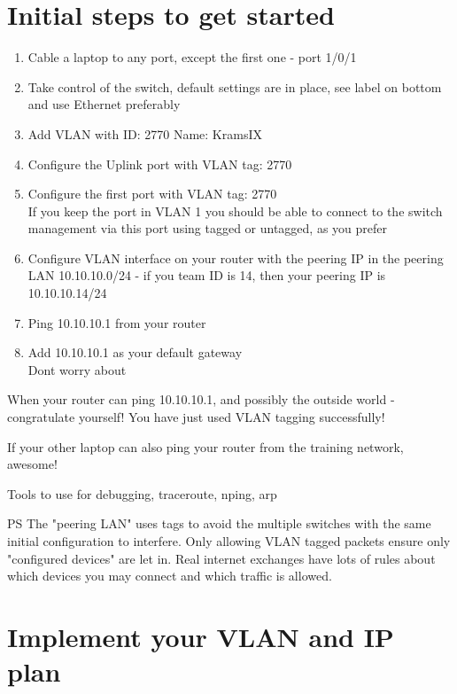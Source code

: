 \documentclass[a4paper,11pt,notitlepage]{report}
\begin{document}
\section*{Initial steps to get started}
\begin{enumerate}
\item Cable a laptop to any port, except the first one - port 1/0/1
\item Take control of the switch, default settings are in place, see label on bottom and use Ethernet preferably
\item Add VLAN with ID: 2770 Name: KramsIX
\item Configure the Uplink port with VLAN tag: 2770
\item Configure the first port with VLAN tag: 2770\\
If you keep the port in VLAN 1 you should be able to connect to the switch management via this port using tagged or untagged, as you prefer \smiley
\item Configure VLAN interface on your router with the peering IP in the peering LAN 10.10.10.0/24 - if you team ID is 14, then your peering IP is 10.10.10.14/24
\item Ping 10.10.10.1 from your router
\item Add 10.10.10.1 as your default gateway\\
Dont worry about
\end{enumerate}


When your router can ping 10.10.10.1, and possibly the outside world - congratulate yourself! You have just used VLAN tagging successfully!

If your other laptop can also ping your router from the training network, awesome!

Tools to use for debugging, traceroute, nping, arp

PS The "peering LAN" uses tags to avoid the multiple switches with the same initial configuration to interfere. Only allowing VLAN tagged packets ensure only "configured devices" are let in. Real internet exchanges have lots of rules about which devices you may connect and which traffic is allowed.

\section*{Implement your VLAN and IP plan}
\end{document}
